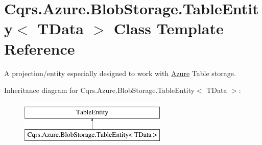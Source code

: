 \hypertarget{classCqrs_1_1Azure_1_1BlobStorage_1_1TableEntity}{}\section{Cqrs.\+Azure.\+Blob\+Storage.\+Table\+Entity$<$ T\+Data $>$ Class Template Reference}
\label{classCqrs_1_1Azure_1_1BlobStorage_1_1TableEntity}


A projection/entity especially designed to work with \hyperlink{namespaceCqrs_1_1Azure}{Azure} Table storage.  


Inheritance diagram for Cqrs.\+Azure.\+Blob\+Storage.\+Table\+Entity$<$ T\+Data $>$\+:\begin{figure}[H]
\begin{center}
\leavevmode
\includegraphics[height=2.000000cm]{classCqrs_1_1Azure_1_1BlobStorage_1_1TableEntity}
\end{center}
\end{figure}
